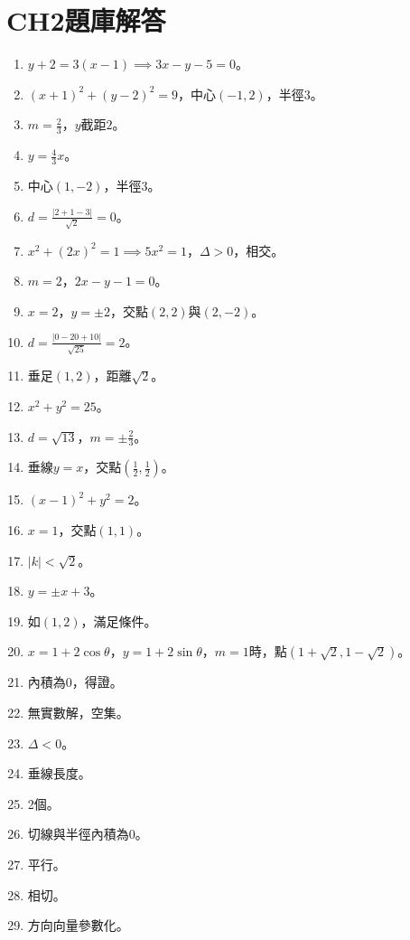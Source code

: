\section{CH2題庫解答}
\begin{enumerate}[label=\arabic*.]
    \item $y + 2 = 3(x - 1) \implies 3x - y - 5 = 0$。
    \item $(x + 1)^2 + (y - 2)^2 = 9$，中心$(-1, 2)$，半徑$3$。
    \item $m = \frac{2}{3}$，$y$截距$2$。
    \item $y = \frac{4}{3}x$。
    \item 中心$(1, -2)$，半徑$3$。
    \item $d = \frac{|2 + 1 - 3|}{\sqrt{2}} = 0$。
    \item $x^2 + (2x)^2 = 1 \implies 5x^2 = 1$，$\Delta > 0$，相交。
    \item $m = 2$，$2x - y - 1 = 0$。
    \item $x = 2$，$y = \pm 2$，交點$(2, 2)$與$(2, -2)$。
    \item $d = \frac{|0 - 20 + 10|}{\sqrt{25}} = 2$。
    \item 垂足$(1, 2)$，距離$\sqrt{2}$。
    \item $x^2 + y^2 = 25$。
    \item $d = \sqrt{13}$，$m = \pm \frac{2}{3}$。
    \item 垂線$y = x$，交點$\left(\frac{1}{2}, \frac{1}{2}\right)$。
    \item $(x - 1)^2 + y^2 = 2$。
    \item $x = 1$，交點$(1, 1)$。
    \item $|k| < \sqrt{2}$。
    \item $y = \pm x + 3$。
    \item 如$(1, 2)$，滿足條件。
    \item $x = 1 + 2\cos\theta$，$y = 1 + 2\sin\theta$，$m = 1$時，點$\left(1 + \sqrt{2}, 1 - \sqrt{2}\right)$。
    \item 內積為0，得證。
    \item 無實數解，空集。
    \item $\Delta < 0$。
    \item 垂線長度。
    \item 2個。
    \item 切線與半徑內積為0。
    \item 平行。
    \item 相切。
    \item 方向向量參數化。

\end{enumerate}
